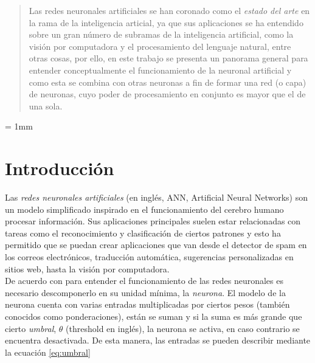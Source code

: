 \documentclass[a4paper,12pt,twocolumn]{article}
\begin{document}
  \onecolumn
  \coverpage%

  \twocolumn
  \begin{abstract}
    Las redes neuronales artificiales se han coronado como el \textit{estado del
    arte} en la rama de la inteligencia articial, ya que sus aplicaciones se ha
    entendido sobre un gran número de subramas de la inteligencia artificial,
    como la visión por computadora y el procesamiento del lenguaje natural,
    entre otras cosas, por ello, en este trabajo se presenta un panorama general
    para entender conceptualmente el funcionamiento de la neuronal artificial y
    como esta se combina con otras neuronas a fin de formar una red (o capa) de
    neuronas, cuyo poder de procesamiento en conjunto es mayor que el de una
    sola.
  \end{abstract}

  {
  \parskip = 1mm
  \tableofcontents
  }
  \listoffigures

  \section{Introducción}

  Las \textit{redes neuronales artificiales} (en inglés,
  \textcolor{blue!70}{ANN}, Artificial Neural
  Networks) son un modelo simplificado inspirado en el funcionamiento del
  cerebro humano procesar información. Sus aplicaciones principales suelen estar
  relacionadas con tareas como el reconocimiento y clasificación de ciertos
  patrones y esto ha permitido que se puedan crear aplicaciones que van desde el
  detector de spam en los correos electrónicos, traducción automática,
  sugerencias personalizadas en sitios web, hasta la visión por
  computadora.\\

  De acuerdo con \cite{savagenotes} para entender el funcionamiento de las redes
  neuronales es necesario descomponerlo en su unidad mínima, la
  \textit{neurona}.  El modelo
  de la neurona cuenta con varias entradas multiplicadas por ciertos pesos
  (también conocidos como ponderaciones), están se suman y si la suma es más
  grande que cierto \textit{umbral}, \(\theta\) (threshold en inglés), la neurona
  se activa, en caso contrario se encuentra desactivada. De esta manera, las
  entradas se pueden describir mediante la ecuación \ref{eq:umbral}
\end{document}
